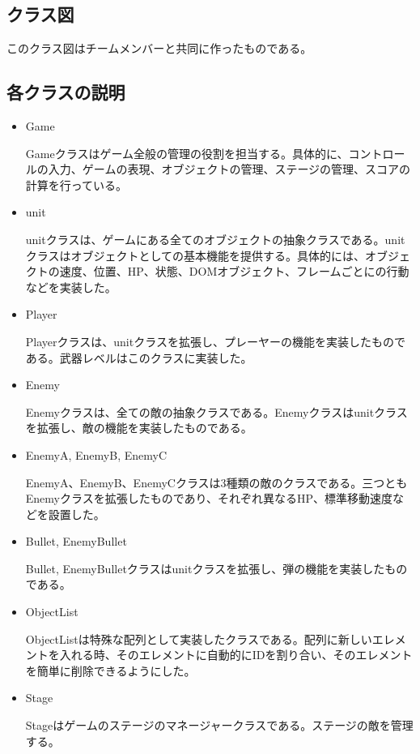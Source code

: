 \subsection{クラス図}
	このクラス図はチームメンバーと共同に作ったものである。
	
\subsection{各クラスの説明}
	\begin{itemize}
		\item Game
		
		Gameクラスはゲーム全般の管理の役割を担当する。具体的に、コントロールの入力、ゲームの表現、オブジェクトの管理、ステージの管理、スコアの計算を行っている。
		\item unit
		
		unitクラスは、ゲームにある全てのオブジェクトの抽象クラスである。unitクラスはオブジェクトとしての基本機能を提供する。具体的には、オブジェクトの速度、位置、HP、状態、DOMオブジェクト、フレームごとにの行動などを実装した。
		\item Player
		
		Playerクラスは、unitクラスを拡張し、プレーヤーの機能を実装したものである。武器レベルはこのクラスに実装した。
		\item Enemy
		
		Enemyクラスは、全ての敵の抽象クラスである。Enemyクラスはunitクラスを拡張し、敵の機能を実装したものである。
		
		\item EnemyA, EnemyB, EnemyC
		
		EnemyA、EnemyB、EnemyCクラスは3種類の敵のクラスである。三つともEnemyクラスを拡張したものであり、それぞれ異なるHP、標準移動速度などを設置した。
		
		\item Bullet, EnemyBullet
		
		Bullet, EnemyBulletクラスはunitクラスを拡張し、弾の機能を実装したものである。
		
		\item ObjectList
		
		ObjectListは特殊な配列として実装したクラスである。配列に新しいエレメントを入れる時、そのエレメントに自動的にIDを割り合い、そのエレメントを簡単に削除できるようにした。
		
		\item Stage
		
		Stageはゲームのステージのマネージャークラスである。ステージの敵を管理する。
	\end{itemize}